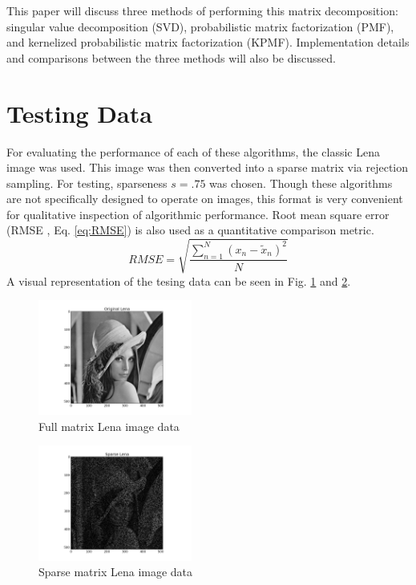\documentclass[journal]{IEEEtran}
\begin{document}
This paper will discuss three methods of performing this matrix decomposition: singular value decomposition (SVD), 
probabilistic matrix factorization (PMF), and kernelized probabilistic matrix factorization (KPMF). Implementation details and comparisons between
the three methods will also be discussed.

\section{Testing Data}
For evaluating the performance of each of these algorithms, the classic Lena image was used. This image was then converted into a sparse matrix via 
rejection sampling. For testing, sparseness \begin{math}s = .75\end{math} was chosen. Though these algorithms are not specifically designed to operate on 
images, this format is very convenient for qualitative inspection of algorithmic performance. Root mean square error (RMSE \cite{RMSE},
Eq. \ref{eq:RMSE}) is also used as a quantitative comparison metric.
\begin{equation}
    RMSE=\sqrt{\frac{\sum\limits^N_{n=1}(x_n-\tilde{x}_{n})^2}{N}}
\label{eq:RMSE}
\end{equation}
A visual representation of the tesing data can be seen in Fig. \ref{fig:lena} and \ref{fig:sparselena}.
\begin{figure}[h!]
\centering
    \includegraphics[width=0.45\textwidth]{lena.png}
    \caption{Full matrix Lena image data}
    \label{fig:lena}
\end{figure}
\begin{figure}[h!]
\centering
    \includegraphics[width=0.45\textwidth]{sparselena.png}
    \caption{Sparse matrix Lena image data}
    \label{fig:sparselena}
\end{figure}
\end{document}
